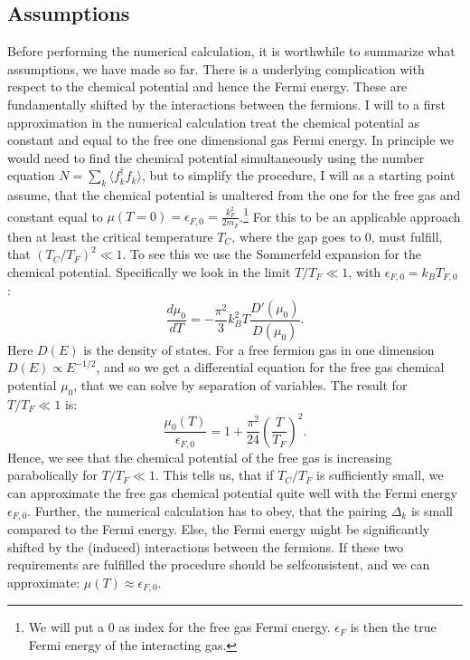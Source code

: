 \subsection{Assumptions}
Before performing the numerical calculation, it is worthwhile to summarize what assumptions, we have made so far.  There is a underlying complication with respect to the chemical potential and hence the Fermi energy. These are fundamentally shifted by the interactions between the fermions. I will to a first approximation in the numerical calculation treat the chemical potential as constant and equal to the free one dimensional gas Fermi energy. In principle we would need to find the chemical potential simultaneously using the number equation $N = \sum_k \langle f_k^\dagger f_k \rangle$, but to simplify the procedure, I will as a starting point assume, that the chemical potential is unaltered from the one for the free gas and constant equal to $\mu(T=0) = \epsilon_{F,0} = \frac{k_F^2}{2m_F}$.\footnote{We will put a $0$ as index for the free gas Fermi energy. $\epsilon_F$ is then the true Fermi energy of the interacting gas.} For this to be an applicable approach then at least the critical temperature $T_C$, where the gap goes to 0, must fulfill, that $\left(T_C/T_F\right)^2 \ll 1$. To see this we use the Sommerfeld expansion for the chemical potential. Specifically we look in the limit $T/T_F \ll 1$, with $\epsilon_{F,0} = k_B T_{F,0}$ \cite{GiuseppeGiuseppe}: 
\begin{equation}
\frac{d\mu_0}{dT} = -\frac{\pi^2}{3}k_B^2 T \frac{D'(\mu_0)}{D(\mu_0)}. \nonumber
\end{equation}
Here $D(E)$ is the density of states. For a free fermion gas in one dimension $D(E)\propto E^{-1/2}$, and so we get a differential equation for the free gas chemical potential $\mu_0$, that we can solve by separation of variables. The result for $T/T_F\ll 1$ is:
\begin{equation}
\frac{\mu_0(T)}{\epsilon_{F,0}} = 1 + \frac{\pi^2}{24}\left(\frac{T}{T_F}\right)^2.
\end{equation}
Hence, we see that the chemical potential of the free gas is increasing parabolically for $T/T_F \ll 1$. This tells us, that if $T_C/T_F$ is sufficiently small, we can approximate the free gas chemical potential quite well with the Fermi energy $\epsilon_{F,0}$. Further, the numerical calculation has to obey, that the pairing $\Delta_k$ is small compared to the Fermi energy. Else, the Fermi energy might be significantly shifted by the (induced) interactions between the fermions. If these two requirements are fulfilled the procedure should be selfconsistent, and we can approximate: $\mu(T) \approx \epsilon_{F,0}$. 

